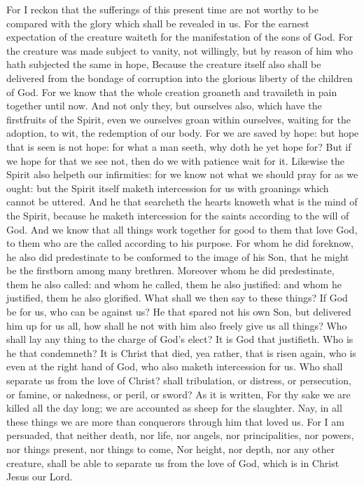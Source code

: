  For I reckon that the sufferings of this present time
are not worthy to be compared with the glory which shall be revealed in
us.  For the earnest expectation of the creature waiteth
for the manifestation of the sons of God.  For the
creature was made subject to vanity, not willingly, but by reason of him
who hath subjected the same in hope,  Because the
creature itself also shall be delivered from the bondage of corruption
into the glorious liberty of the children of God.  For we
know that the whole creation groaneth and travaileth in pain together
until now.  And not only they, but ourselves also, which
have the firstfruits of the Spirit, even we ourselves groan within
ourselves, waiting for the adoption, to wit, the redemption of our body.
 For we are saved by hope: but hope that is seen is not
hope: for what a man seeth, why doth he yet hope for? 
But if we hope for that we see not, then do we with patience wait for
it.  Likewise the Spirit also helpeth our infirmities:
for we know not what we should pray for as we ought: but the Spirit
itself maketh intercession for us with groanings which cannot be
uttered.  And he that searcheth the hearts knoweth what
is the mind of the Spirit, because he maketh intercession for the saints
according to the will of God.  And we know that all
things work together for good to them that love God, to them who are the
called according to his purpose.  For whom he did
foreknow, he also did predestinate to be conformed to the image of his
Son, that he might be the firstborn among many brethren. 
Moreover whom he did predestinate, them he also called: and whom he
called, them he also justified: and whom he justified, them he also
glorified.  What shall we then say to these things? If
God be for us, who can be against us?  He that spared not
his own Son, but delivered him up for us all, how shall he not with him
also freely give us all things?  Who shall lay any thing
to the charge of God's elect? It is God that justifieth. 
Who is he that condemneth? It is Christ that died, yea rather, that is
risen again, who is even at the right hand of God, who also maketh
intercession for us.  Who shall separate us from the love
of Christ? shall tribulation, or distress, or persecution, or famine, or
nakedness, or peril, or sword?  As it is written, For thy
sake we are killed all the day long; we are accounted as sheep for the
slaughter.  Nay, in all these things we are more than
conquerors through him that loved us.  For I am
persuaded, that neither death, nor life, nor angels, nor principalities,
nor powers, nor things present, nor things to come,  Nor
height, nor depth, nor any other creature, shall be able to separate us
from the love of God, which is in Christ Jesus our Lord.

